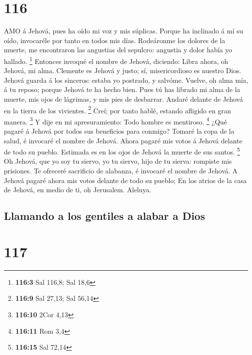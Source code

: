 \hypertarget{section-115}{%
\section{116}\label{section-115}}

 AMO á Jehová, pues ha oído mi voz y mis súplicas.
 Porque ha inclinado á mí su oído, invocaréle por tanto en
todos mis días.  Rodeáronme los dolores de la muerte, me
encontraron las angustias del sepulcro: angustia y dolor había yo
hallado. \footnote{\textbf{116:3} Sal 116,8; Sal 18,6} 
Entonces invoqué el nombre de Jehová, diciendo: Libra ahora, oh Jehová,
mi alma.  Clemente es Jehová y justo; sí, misericordioso es
nuestro Dios.  Jehová guarda á los sinceros: estaba yo
postrado, y salvóme.  Vuelve, oh alma mía, á tu reposo;
porque Jehová te ha hecho bien.  Pues tú has librado mi alma
de la muerte, mis ojos de lágrimas, y mis pies de desbarrar.
 Andaré delante de Jehová en la tierra de los vivientes.
\footnote{\textbf{116:9} Sal 27,13; Sal 56,14}  Creí; por
tanto hablé, estando afligido en gran manera. \footnote{\textbf{116:10}
  2Cor 4,13}  Y dije en mi apresuramiento: Todo hombre es
mentiroso. \footnote{\textbf{116:11} Rom 3,4}  ¿Qué pagaré
á Jehová por todos sus beneficios para conmigo?  Tomaré la
copa de la salud, é invocaré el nombre de Jehová.  Ahora
pagaré mis votos á Jehová delante de todo su pueblo. 
Estimada es en los ojos de Jehová la muerte de sus santos. \footnote{\textbf{116:15}
  Sal 72,14}  Oh Jehová, que yo soy tu siervo, yo tu
siervo, hijo de tu sierva: rompiste mis prisiones.  Te
ofreceré sacrificio de alabanza, é invocaré el nombre de Jehová.
 A Jehová pagaré ahora mis votos delante de todo su pueblo;
 En los atrios de la casa de Jehová, en medio de ti, oh
Jerusalem. Aleluya.

\hypertarget{llamando-a-los-gentiles-a-alabar-a-dios}{%
\subsection{Llamando a los gentiles a alabar a
Dios}\label{llamando-a-los-gentiles-a-alabar-a-dios}}

\hypertarget{section-116}{%
\section{117}\label{section-116}}

